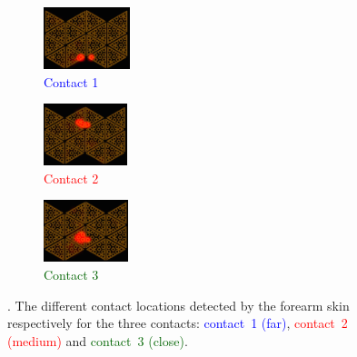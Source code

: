 	\begin{figure}[t]
		\centering
		\begin{subfigure}[t]{0.30\hsize}
        \centering
			\includegraphics[height=1.8cm]{fig/paris2_new} 
			\caption{\textcolor{blue}{Contact 1}}
		\end{subfigure}
		\hspace{0.1cm}
		\begin{subfigure}[t]{0.30\hsize}
        \centering
			\includegraphics[height=1.8cm]{fig/paris3_new} 
			\caption{\textcolor{red}{Contact 2}}
		\end{subfigure}
		\hspace{0.1cm}
		\begin{subfigure}[t]{0.30\hsize}
        \centering
			\includegraphics[height=1.8cm]{fig/paris7_new}
			\caption{\textcolor{darkgreen}{Contact 3}}
		\end{subfigure}
		\caption{\textbf{}. The different contact locations detected by the forearm skin respectively for the three contacts: \textcolor{blue}{contact~1 (far)}, \textcolor{red}{contact~2 (medium)} and \textcolor{darkgreen}{contact~3 (close)}.}
		\label{fig:exp2:skin}
        \figspace
	\end{figure}

